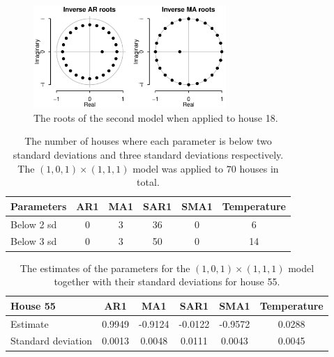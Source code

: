 \begin{figure}
    \centering
    \includegraphics[width=0.65\textwidth]{../../../figures/arimax/Roots_18.eps}
    \caption{The roots of the second model when applied to house 18.}
    \label{fig:Model2_stationarity18}
\end{figure}
\begin{table}[ht]
    \centering
    \begin{tabular}{l|ccccc}
    \hline
    \textbf{Parameters} & \textbf{AR1} & \textbf{MA1} & \textbf{SAR1} & \textbf{SMA1} & \textbf{Temperature} \\ \hline \hline
    Below 2 sd & 0   & 3   & 36   & 0    & 6           \\
    Below 3 sd & 0   & 3   & 50   & 0    & 14          \\ \hline
    \end{tabular}
    \caption{The number of houses where each parameter is below two standard deviations and three standard deviations respectively. The $(1,0,1)\times (1,1,1)$ model was applied to $70$ houses in total.}
    \label{tab:ParamSig_Model1}
\end{table}
\begin{table}
    \centering
    \begin{tabular}{l|ccccc}
    \hline
    \textbf{House 55} & \textbf{AR1} & \textbf{MA1} & \textbf{SAR1} & \textbf{SMA1} & \textbf{Temperature} \\ \hline \hline
    Estimate           & 0.9949 & -0.9124 & -0.0122 & -0.9572 & 0.0288      \\
    Standard deviation & 0.0013 & 0.0048  & 0.0111  & 0.0043  & 0.0045      \\ \hline
    \end{tabular}
    \caption{The estimates of the parameters for the $(1,0,1)\times (1,1,1)$ model together with their standard deviations for house 55.}
    \label{tab:ParamSig_House55}
 \end{table}
